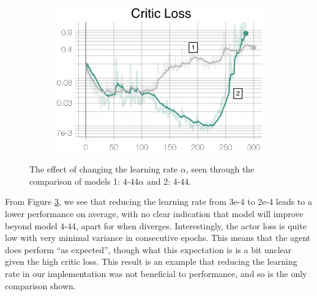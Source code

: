 \begin{figure}[hbt]
\begin{subfigure}[b]{0.32\textwidth}
         \caption{}
         \label{fig:5_training_ppo_learningRateActorL}
     \end{subfigure}
     \hfill
     \begin{subfigure}[b]{0.32\textwidth}
         \centering
         \includegraphics[width=\textwidth]{figures/5_/Training/ppo_learningRateCriticL.png}
         \caption{}
         \label{fig:5_training_ppo_learningRateCriticL}
     \end{subfigure}
    \captionsetup{justification=centering}
    \caption{The effect of changing the learning rate $\alpha$, seen through the comparison of models 1: 4-44$\alpha$ and 2: 4-44.}
     \label{fig:5_training_ppo_learningRate}
\end{figure}
From Figure \ref{fig:5_training_ppo_learningRate}, we see that reducing the learning rate from 3e-4 to 2e-4 leads to a lower performance on average, with no clear indication that model \one will improve beyond model 4-44, apart for when \two diverges. Interestingly, the actor loss is quite low with very minimal variance in consecutive epochs. This means that the agent does perform ``as expected'', though what this expectation is is a bit unclear given the high critic loss. This result is an example that reducing the learning rate in our implementation was not beneficial to performance, and so is the only comparison shown.


